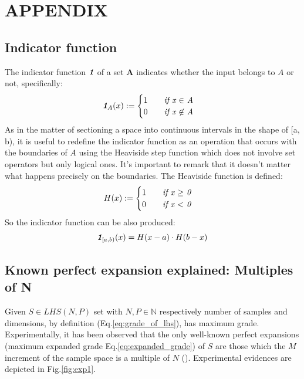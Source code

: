 \documentclass[12pt]{extarticle}
\newcommand{\meqref}[1]{Eq.\ref{#1}}
\newcommand{\mfigref}[1]{Fig.\ref{#1}}
\newcommand{\indfunc}[1]{\textit{\textbf{1}}_{#1}}
\begin{document}
\section{APPENDIX}
\subsection{Indicator function}
\label{appendix:indicator_function}
The indicator function $\indfunc{}$ of a set \textbf{A} indicates whether the input belongs to $A$ or not, specifically:
\begin{equation}
\label{eq:indicator_function}
\indfunc{A}(x) := 
\begin{cases}
1 \qquad \text{\textit{if x $\in$ A}}\\
0 \qquad \text{\textit{if x $\not\in$ A}}
 \end{cases}
\end{equation}
As in the matter of sectioning a space into continuous intervals in the shape of [a, b), it is useful to redefine the indicator function as an operation that occurs with the boundaries of $A$ using the Heaviside step function which does not involve set operators but only logical ones. It's important to remark that it doesn't matter what happens precisely on the boundaries. 
The Heaviside function is defined:
\begin{equation}
\label{eq:heaviside}
H(x) := 
\begin{cases}
1 \qquad \text{\textit{if x $\geq$ 0}}\\
0 \qquad \text{\textit{if x $<$ 0}}
\end{cases}
\end{equation}
So the indicator function can be also produced:
\begin{equation}
\label{eq:indicator_function_with_h}
\indfunc{[a,b)}(x) = H(x - a) \cdot H(b - x)
\end{equation}

\subsection{Known perfect expansion explained: Multiples of N}
\label{appendix:N_multiples}
Given $S \in LHS(N, P)$ set with $N, P \in \mathbb{N}$ respectively number of samples and dimensions, by definition (\meqref{eq:grade_of_lhs}), has maximum grade. Experimentally, it has been observed that the only well-known perfect expansions (maximum expanded grade \meqref{eq:expanded_grade}) of $S$ are those which the $M$ increment of the sample space is a multiple of $N$ (). Experimental evidences are depicted in \mfigref{fig:exp1}.
\end{document}
